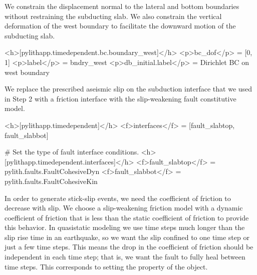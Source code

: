 We constrain the displacement normal to the lateral and bottom
boundaries without restraining the subducting slab. We also constrain
the vertical deformation of the west boundary to facilitate the
downward motion of the subducting slab.
\begin{cfg}
<h>[pylithapp.timedependent.bc.boundary_west]</h>
<p>bc_dof</p> = [0, 1]
<p>label</p> = bndry_west
<p>db_initial.label</p> = Dirichlet BC on west boundary
\end{cfg}

We replace the prescribed aseismic slip
on the subduction interface that we used in Step 2 with a friction interface with the
slip-weakening fault constitutive model. 
\begin{cfg}
<h>[pylithapp.timedependent]</h>
<f>interfaces</f> = [fault_slabtop, fault_slabbot]

# Set the type of fault interface conditions.
<h>[pylithapp.timedependent.interfaces]</h>
<f>fault_slabtop</f> = pylith.faults.FaultCohesiveDyn
<f>fault_slabbot</f> = pylith.faults.FaultCohesiveKin
\end{cfg}

In order to generate stick-slip events, we need the coefficient of
friction to decrease with slip. We choose a slip-weakening friction
model with a dynamic coefficient of friction that is less than the
static coefficient of friction to provide this behavior. In
quasistatic modeling we use time steps much longer than the slip rise
time in an earthquake, so we want the slip confined to one time step
or just a few time steps. This means the drop in the coefficient of
friction should be independent in each time step; that is, we want the
fault to fully heal between time steps. This corresponds to setting
the  property of the 
object.

